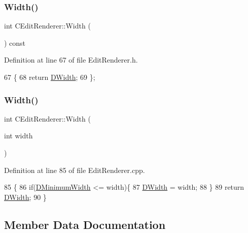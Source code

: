 \subsubsection{\texorpdfstring{Width()}{Width()}\hspace{0.1cm}{\footnotesize\ttfamily [1/2]}}
{\footnotesize\ttfamily int C\+Edit\+Renderer\+::\+Width (\begin{DoxyParamCaption}{ }\end{DoxyParamCaption}) const\hspace{0.3cm}{\ttfamily [inline]}}



Definition at line 67 of file Edit\+Renderer.\+h.


\begin{DoxyCode}
67                          \{
68             \textcolor{keywordflow}{return} \hyperlink{classCEditRenderer_ab203e5083f61d3575eb491f170c21d45}{DWidth};
69         \};
\end{DoxyCode}
\hypertarget{classCEditRenderer_a9b9e7e4fa7e7c2ef8c8b4bd09c4122ac}{}\label{classCEditRenderer_a9b9e7e4fa7e7c2ef8c8b4bd09c4122ac} 
\subsubsection{\texorpdfstring{Width()}{Width()}\hspace{0.1cm}{\footnotesize\ttfamily [2/2]}}
{\footnotesize\ttfamily int C\+Edit\+Renderer\+::\+Width (\begin{DoxyParamCaption}\item[{int}]{width }\end{DoxyParamCaption})}



Definition at line 85 of file Edit\+Renderer.\+cpp.


\begin{DoxyCode}
85                                  \{
86     \textcolor{keywordflow}{if}(\hyperlink{classCEditRenderer_aba068f1e6d267e5ac0ed5752304133e8}{DMinimumWidth} <= width)\{
87         \hyperlink{classCEditRenderer_ab203e5083f61d3575eb491f170c21d45}{DWidth} = width;   
88     \}
89     \textcolor{keywordflow}{return} \hyperlink{classCEditRenderer_ab203e5083f61d3575eb491f170c21d45}{DWidth};
90 \}
\end{DoxyCode}


\subsection{Member Data Documentation}
\hypertarget{classCEditRenderer_a7e5e1b18db4c53fe288c200aed673ccf}{}\label{classCEditRenderer_a7e5e1b18db4c53fe288c200aed673ccf} 
